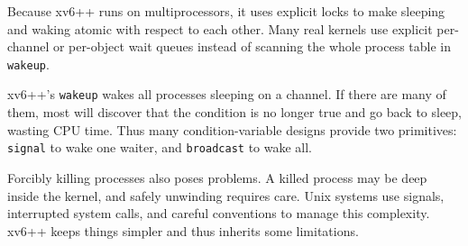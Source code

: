 Because xv6++ runs on multiprocessors,
it uses explicit locks to make sleeping and waking atomic
with respect to each other.
Many real kernels use explicit per-channel or per-object wait queues
instead of scanning the whole process table in \lstinline{wakeup}.

xv6++'s \lstinline{wakeup} wakes all processes sleeping on a channel.
If there are many of them, most will discover that the condition is
no longer true and go back to sleep, wasting CPU time.
Thus many condition-variable designs provide two primitives:
\lstinline{signal} to wake one waiter, and \lstinline{broadcast} to wake all.

Forcibly killing processes also poses problems.
A killed process may be deep inside the kernel, and safely unwinding
requires care. Unix systems use signals, interrupted system calls,
and careful conventions to manage this complexity. xv6++ keeps things
simpler and thus inherits some limitations.
